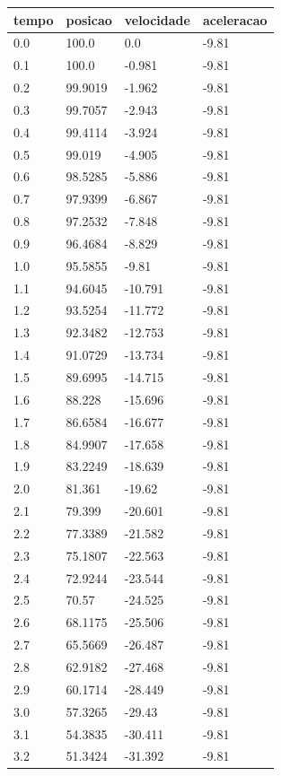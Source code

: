 \begin{tabular}{llll}
\toprule
tempo & posicao & velocidade & aceleracao \\
\midrule
0.0 & 100.0 & 0.0 & -9.81 \\
0.1 & 100.0 & -0.981 & -9.81 \\
0.2 & 99.9019 & -1.962 & -9.81 \\
0.3 & 99.7057 & -2.943 & -9.81 \\
0.4 & 99.4114 & -3.924 & -9.81 \\
0.5 & 99.019 & -4.905 & -9.81 \\
0.6 & 98.5285 & -5.886 & -9.81 \\
0.7 & 97.9399 & -6.867 & -9.81 \\
0.8 & 97.2532 & -7.848 & -9.81 \\
0.9 & 96.4684 & -8.829 & -9.81 \\
1.0 & 95.5855 & -9.81 & -9.81 \\
1.1 & 94.6045 & -10.791 & -9.81 \\
1.2 & 93.5254 & -11.772 & -9.81 \\
1.3 & 92.3482 & -12.753 & -9.81 \\
1.4 & 91.0729 & -13.734 & -9.81 \\
1.5 & 89.6995 & -14.715 & -9.81 \\
1.6 & 88.228 & -15.696 & -9.81 \\
1.7 & 86.6584 & -16.677 & -9.81 \\
1.8 & 84.9907 & -17.658 & -9.81 \\
1.9 & 83.2249 & -18.639 & -9.81 \\
2.0 & 81.361 & -19.62 & -9.81 \\
2.1 & 79.399 & -20.601 & -9.81 \\
2.2 & 77.3389 & -21.582 & -9.81 \\
2.3 & 75.1807 & -22.563 & -9.81 \\
2.4 & 72.9244 & -23.544 & -9.81 \\
2.5 & 70.57 & -24.525 & -9.81 \\
2.6 & 68.1175 & -25.506 & -9.81 \\
2.7 & 65.5669 & -26.487 & -9.81 \\
2.8 & 62.9182 & -27.468 & -9.81 \\
2.9 & 60.1714 & -28.449 & -9.81 \\
3.0 & 57.3265 & -29.43 & -9.81 \\
3.1 & 54.3835 & -30.411 & -9.81 \\
3.2 & 51.3424 & -31.392 & -9.81 \\

\end{tabular}
